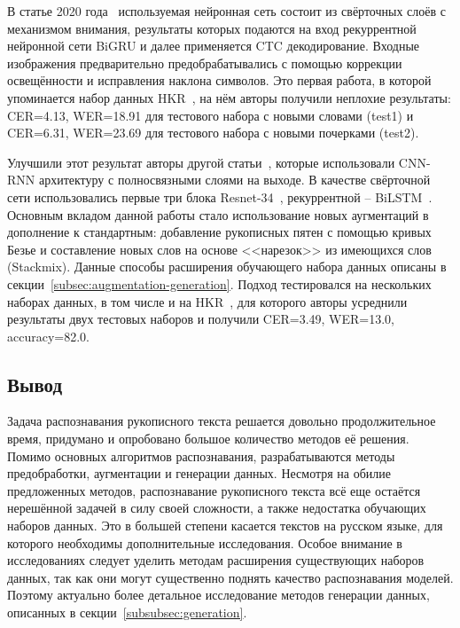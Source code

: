 В статье 2020 года~\cite{abdallah2020attention} используемая нейронная сеть состоит из свёрточных слоёв с механизмом внимания,
результаты которых подаются на вход рекуррентной нейронной сети BiGRU и далее применяется CTC декодирование.
Входные изображения предварительно предобрабатывались с помощью коррекции освещённости и исправления наклона символов.
Это первая работа, в которой упоминается набор данных HKR~\cite{nurseitov2021handwritten},
на нём авторы получили неплохие результаты: CER=4.13, WER=18.91 для тестового набора с новыми словами (test1) и
CER=6.31, WER=23.69 для тестового набора с новыми почерками (test2).

Улучшили этот результат авторы другой статьи~\cite{shonenkov2021stackmix}, которые использовали CNN-RNN архитектуру с полносвязными слоями на выходе.
В качестве свёрточной сети использовались первые три блока Resnet-34~\cite{he2016deep}, рекуррентной -- BiLSTM~\cite{hochreiter1997long}.
Основным вкладом данной работы стало использование новых аугментаций в дополнение к стандартным:
добавление рукописных пятен с помощью кривых Безье и составление новых слов на основе <<нарезок>> из имеющихся слов (Stackmix).
Данные способы расширения обучающего набора данных описаны в секции~\ref{subsec:augmentation-generation}.
Подход тестировался на нескольких наборах данных, в том числе и на HKR~\cite{nurseitov2021handwritten},
для которого авторы усреднили результаты двух тестовых наборов и получили CER=3.49, WER=13.0, accuracy=82.0.


\subsection{Вывод}
\label{subsec:review_conclusion}

Задача распознавания рукописного текста решается довольно продолжительное время,
придумано и опробовано большое количество методов её решения.
Помимо основных алгоритмов распознавания, разрабатываются методы предобработки, аугментации и генерации данных.
Несмотря на обилие предложенных методов, распознавание рукописного текста всё еще остаётся нерешённой задачей в силу
своей сложности, а также недостатка обучающих наборов данных.
Это в большей степени касается текстов на русском языке, для которого необходимы дополнительные исследования.
Особое внимание в исследованиях следует уделить методам расширения существующих наборов данных,
так как они могут существенно поднять качество распознавания моделей.
Поэтому актуально более детальное исследование методов генерации данных, описанных в секции~\ref{subsubsec:generation}.
